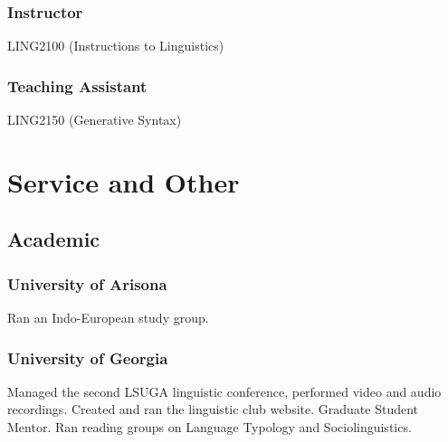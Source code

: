 \documentclass{article}
\begin{document}
\subsubsection{Instructor}

LING2100 (Instructions to Linguistics)

\subsubsection{Teaching Assistant}

LING2150 (Generative Syntax)

\section{Service and Other}

\subsection{Academic}

\subsubsection{University of Arisona}

Ran an Indo-European study group.

\subsubsection{University of Georgia}

Managed the second LSUGA linguistic conference, performed video and audio recordings. Created and ran the linguistic club website. Graduate Student Mentor. Ran reading groups on Language Typology and Sociolinguistics.
\end{document}
